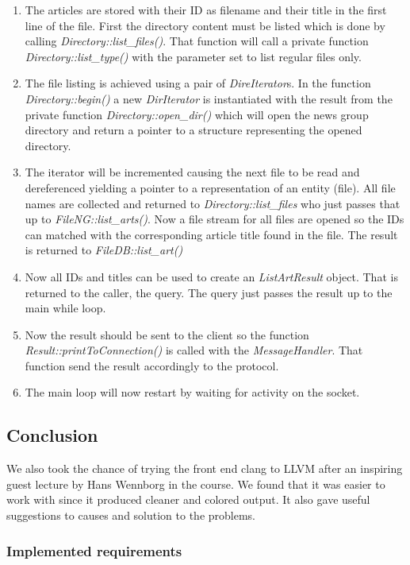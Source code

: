 \documentclass[10pt, a4paper]{article}
\begin{document}
\begin{enumerate}
	\item The articles are stored with their ID as filename and their title in the first line of the file. First the directory content must be listed which is done by calling \emph{Directory::list\_files()}. That function will call a private function \emph{Directory::list\_type()} with the parameter set to list regular files only.
	\item The file listing is achieved using a pair of \emph{DireIterator}s. In the function \emph{Directory::begin()} a new \emph{DirIterator} is instantiated with the result from the private function \emph{Directory::open\_dir()} which will open the news group directory and return a pointer to a structure representing the opened directory.
	\item The iterator will be incremented causing the next file to be read and dereferenced yielding a pointer to a representation of an entity (file). All file names are collected and returned to \emph{Directory::list\_files} who just passes that up to \emph{FileNG::list\_arts()}. Now a file stream for all files are opened so the IDs can matched with the corresponding article title found in the file. The result is returned to \emph{FileDB::list\_art()}
	\item Now all IDs and  titles can be used to create an \emph{ListArtResult} object.  That is returned to the caller, the query. The query just passes the result up to the main while loop.
	\item Now the result should be sent to the client so the function \emph{Result::printToConnection()} is called with the \emph{MessageHandler}. That function send the result accordingly to the protocol.
	\item The main loop will now restart by waiting for activity on the socket.
\end{enumerate}


\subsection{Conclusion}


We also took the chance of trying the front end clang to LLVM after an inspiring guest lecture by Hans Wennborg in the course. We found that it was easier to work with since it produced cleaner and colored output. It also gave useful suggestions to causes and solution to the problems.

\subsubsection{Implemented requirements}
\end{document}
